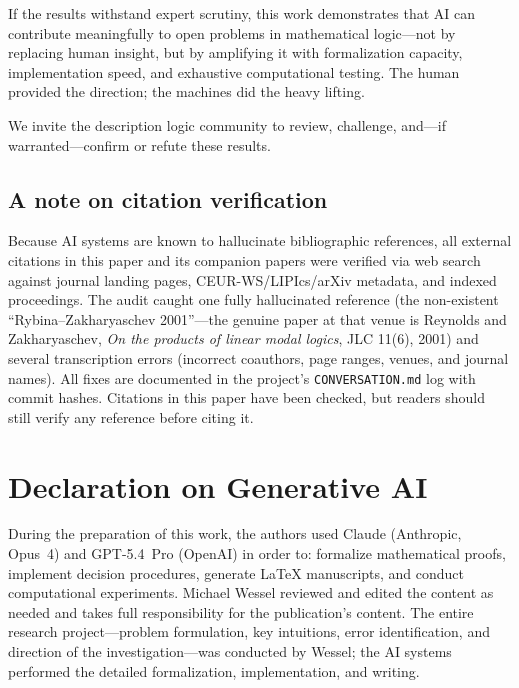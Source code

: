 \documentclass[
]{ceurart}
\theoremstyle{definition}
\begin{document}
If the results withstand expert scrutiny, this work demonstrates
that AI can contribute meaningfully to open problems in
mathematical logic---not by replacing human insight, but by
amplifying it with formalization capacity, implementation speed,
and exhaustive computational testing.  The human provided
the direction; the machines did the heavy lifting.

We invite the description logic community to review, challenge,
and---if warranted---confirm or refute these results.

\subsection{A note on citation verification}

Because AI systems are known to hallucinate bibliographic references,
all external citations in this paper and its companion papers were
verified via web search against journal landing pages,
CEUR-WS/LIPIcs/arXiv metadata, and indexed proceedings.  The audit
caught one fully hallucinated reference (the non-existent
``Rybina--Zakharyaschev 2001''---the genuine paper at that venue is
Reynolds and Zakharyaschev, \emph{On the products of linear modal
logics}, JLC 11(6), 2001) and several transcription errors
(incorrect coauthors, page ranges, venues, and journal names).  All
fixes are documented in the project's \texttt{CONVERSATION.md} log
with commit hashes.  Citations in this paper have been checked, but
readers should still verify any reference before citing it.

\section*{Declaration on Generative AI}

During the preparation of this work, the authors used Claude (Anthropic,
Opus~4) and GPT-5.4~Pro (OpenAI) in order to: formalize mathematical
proofs, implement decision procedures, generate LaTeX manuscripts,
and conduct computational experiments.  Michael Wessel reviewed and
edited the content as needed and takes full responsibility for the
publication's content.  The entire research project---problem
formulation, key intuitions, error identification, and direction of
the investigation---was conducted by Wessel; the AI systems performed
the detailed formalization, implementation, and writing.
\end{document}
